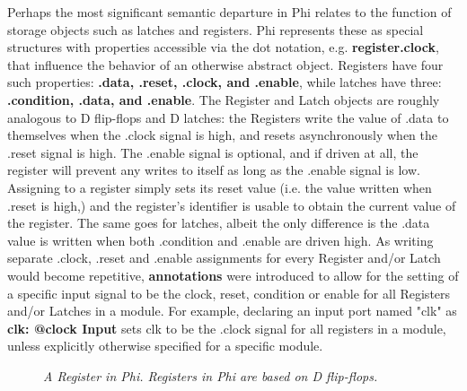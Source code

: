 \documentclass[10pt, two column]{article}
\theoremstyle{definition}
\begin{document}
Perhaps the most significant semantic departure in Phi relates to the function of storage objects such as latches and registers. Phi represents these as special structures with properties accessible via the dot notation, e.g. \textbf{register.clock}, that influence the behavior of an otherwise abstract object. Registers have four such properties: \textbf{.data, .reset, .clock, and .enable}, while latches have three: \textbf{.condition, .data, and .enable}. The Register and Latch objects are roughly analogous to D flip-flops and D latches: the Registers write the value of .data to themselves when the .clock signal is high, and resets asynchronously when the .reset signal is high. The .enable signal is optional, and if driven at all, the register will prevent any writes to itself as long as the .enable signal is low. Assigning to a register simply sets its reset value (i.e. the value written when .reset is high,) and the register's identifier is usable to obtain the current value of the register. The same goes for latches, albeit the only difference is the .data value is written when both .condition and .enable are driven high. As writing separate .clock, .reset and .enable assignments for every Register and/or Latch would become repetitive, \textbf{annotations} were introduced to allow for the setting of a specific input signal to be the clock, reset, condition or enable for all Registers and/or Latches in a module. For example, declaring an input port named "clk" as \textbf{clk: @clock Input} sets clk to be the .clock signal for all registers in a module, unless explicitly otherwise specified for a specific module.\par

\begin{figure}
  \caption{\textit{A Register in Phi. Registers in Phi are based on D flip-flops.}}
  \label{fig: a register in Phi.}
\end{figure}
\end{document}
